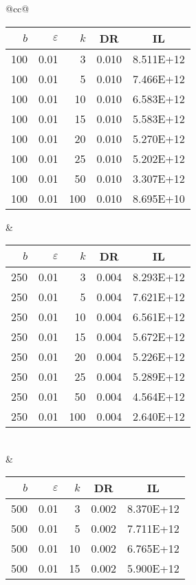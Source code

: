 \begin{table}[H]
	\centering
	\begin{tabular}{@{}cc@{}}
		\begin{tabular}{@{}rrrrr@{}}
			\toprule
			$b$ & $\varepsilon$ & $k$ & \multicolumn{1}{c}{DR} & \multicolumn{1}{c}{IL} \\ \midrule
			100	&	0.01	&	3	&	0.010	&	8.511E+12 \\
			100	&	0.01	&	5	&	0.010	&	7.466E+12 \\
			100	&	0.01	&	10	&	0.010	&	6.583E+12 \\
			100	&	0.01	&	15	&	0.010	&	5.583E+12 \\
			100	&	0.01	&	20	&	0.010	&	5.270E+12 \\
			100	&	0.01	&	25	&	0.010	&	5.202E+12 \\
			100	&	0.01	&	50	&	0.010	&	3.307E+12 \\
			100	&	0.01	&	100	&	0.010	&	8.695E+10 \\
		\end{tabular}
		&
		\begin{tabular}{@{}rrrrr@{}}
			\toprule
			$b$ & $\varepsilon$ & $k$ & \multicolumn{1}{c}{DR} & \multicolumn{1}{c}{IL} \\ \midrule
			250	&	0.01	&	3	&	0.004	&	8.293E+12 \\
			250	&	0.01	&	5	&	0.004	&	7.621E+12 \\
			250	&	0.01	&	10	&	0.004	&	6.561E+12 \\
			250	&	0.01	&	15	&	0.004	&	5.672E+12 \\
			250	&	0.01	&	20	&	0.004	&	5.226E+12 \\
			250	&	0.01	&	25	&	0.004	&	5.289E+12 \\
			250	&	0.01	&	50	&	0.004	&	4.564E+12 \\
			250	&	0.01	&	100	&	0.004	&	2.640E+12 \\
		\end{tabular}
		\\ & \\
		\begin{tabular}{@{}rrrrr@{}}
			\toprule
			$b$ & $\varepsilon$ & $k$ & \multicolumn{1}{c}{DR} & \multicolumn{1}{c}{IL} \\ \midrule
			500	&	0.01	&	3	&	0.002	&	8.370E+12 \\
			500	&	0.01	&	5	&	0.002	&	7.711E+12 \\
			500	&	0.01	&	10	&	0.002	&	6.765E+12 \\
			500	&	0.01	&	15	&	0.002	&	5.900E+12 \\

\end{tabular}
\end{tabular}
\end{table}

